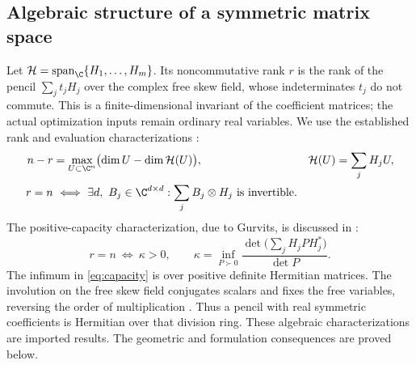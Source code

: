 \subsection{Algebraic structure of a symmetric matrix space}

Let $\mathcal H=\operatorname{span}_{\C}\{H_1,\ldots,H_m\}$.
Its noncommutative rank $r$ is the rank of the pencil
$\sum_jt_jH_j$ over the complex free skew field, whose indeterminates
$t_j$ do not commute. This is a finite-dimensional invariant of the
coefficient matrices; the actual optimization inputs remain ordinary
real variables. We use the established rank and evaluation characterizations
\citep[Theorems 1.4 and 1.17]{ggow2020}:
\begin{align}
 n-r&=\max_{U\subset\C^n}
       \bigl(\dim U-\dim\mathcal H(U)\bigr),
 &\mathcal H(U)&=\sum_jH_jU,\label{eq:shrunk}\\
 r=n&\ \Longleftrightarrow\ 
 \exists d,\ B_j\in\C^{d\times d}:
       \sum_j B_j\otimes H_j\text{ is invertible}.\label{eq:evaluation}
\end{align}
The positive-capacity characterization, due to Gurvits, is discussed in
\citet[Section 1.5, concluding discussion on p.~237, and Section 2]{ggow2020}:
\begin{equation}\label{eq:capacity}
 r=n\ \Longleftrightarrow\ \kappa>0,
 \qquad\kappa=\inf_{P\succ0}
 \frac{\det\bigl(\sum_jH_jPH_j^*\bigr)}{\det P}.
\end{equation}
The infimum in \eqref{eq:capacity} is over positive definite Hermitian
matrices. The involution on the free skew field conjugates scalars and
fixes the free variables, reversing the order of multiplication
\citep[Section 2.1]{volcic2021}. Thus a pencil with real symmetric
coefficients is Hermitian over that division ring. These algebraic
characterizations are imported results. The geometric and formulation
consequences are proved below.

